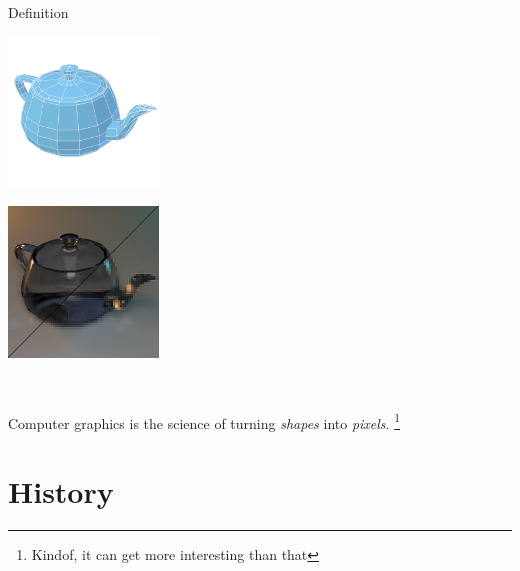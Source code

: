 \documentclass{lug}
\newcommand{\pmidg}[1]{\parbox{\widthof{#1}}{#1}}
\begin{document}
\begin{frame}{Definition}
\begin{center}
    \pmidg{\includegraphics[width=4cm]{graphics/teapot_mesh}} \scalebox{2}{$\rightarrow$} \pmidg{\includegraphics[width=4cm]{graphics/teapot_rt_pix}} \\
    
    \bigskip

    Computer graphics is the science of turning \textit{shapes} into \textit{pixels}. \footnote{Kindof, it can get more interesting than that}
\end{center}
\end{frame}

\section{History}
\end{document}
